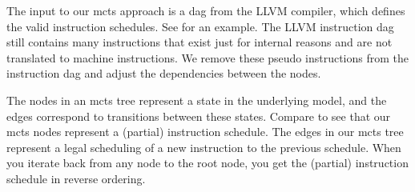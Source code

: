 The input to our \ac{mcts} approach is a \ac{dag} from the LLVM compiler, which defines the valid instruction schedules.
See  for an example.
The LLVM instruction \ac{dag} still contains many instructions that exist just for internal reasons and are not translated to machine instructions.
We remove these pseudo instructions from the instruction \ac{dag} and adjust the dependencies between the nodes.

The nodes in an \ac{mcts} tree represent a state in the underlying model, and the edges correspond to transitions between these states.
Compare  to see that our \ac{mcts} nodes represent a (partial) instruction schedule.
The edges in our \ac{mcts} tree represent a legal scheduling of a new instruction to the previous schedule.
When you iterate back from any node to the root node, you get the (partial) instruction schedule in reverse ordering.
